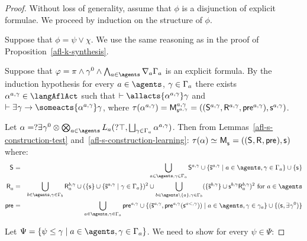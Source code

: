 \begin{proof}
    Without loss of generality, assume that $\phi$ is a disjunction of explicit formulae.
    We proceed by induction on the structure of $\phi$.

    Suppose that $\phi = \psi \lor \chi$. We use the same reasoning as in the proof of Proposition~\ref{afl-k-synthesis}.

    Suppose that $\phi = \pi \land \gamma^0 \land \bigwedge_{\agentA \in \agents} \coversA \Gamma_\agentA$ is an explicit formula.
    By the induction hypothesis for every $\agentA \in \agents$, $\gamma \in \Gamma_a$ there exists $\alpha^{\agentA,\gamma} \in \langAflAct$ such that $\proves \allacts{\alpha^{\agentA,\gamma}} \gamma$ and $\proves \somerefs \gamma \implies \someacts{\alpha^{\agentA,\gamma}} \gamma$, where $\tau(\alpha^{\agentA,\gamma}) = \aPModel[\agentA,\gamma]{\aStateS[\agentA,\gamma]} = \aPModelTuple[\agentA,\gamma]{\aStateS[\agentA,\gamma]}$.

    Let $\alpha = \test{\somerefs \gamma^0} \compose \bigcompose_{\agentA \in \agents} \learns_\agentA (\test{\top}, \bigchoice_{\gamma \in \Gamma_\agentA} \alpha^{\agentA,\gamma})$.
    Then from Lemmas~\ref{afl-s-construction-test} and~\ref{afl-s-construction-learning}: $\tau(\alpha) \bisimilar \aPModel{\aStateS} = \aPModelTuple{\aStateS}$ where:
    \begin{eqnarray*}
        \aStates &=& \bigcup_{\agentA \in \agents, \gamma \in \Gamma_\agentA} \aStates[\agentA,\gamma] \cup \{\aPStateS[\agentA,\gamma] \mid \agentA \in \agents, \gamma \in \Gamma_\agentA\} \cup \{\aStateS\}\\
        \aAccessibility{\agentA} &=& \bigcup_{\agentB \in \agents, \gamma \in \Gamma_\agentB} \aAccessibility[\agentB,\gamma]{\agentA} \cup (\{\aStateS\} \cup \{\aPStateS[\agentA,\gamma] \mid \gamma \in \Gamma_\agentA\})^2 \cup \bigcup_{\agentB \in \agents \setminus \{\agentA\}, \gamma \in \Gamma_\agentB} (\{\aPStateS[\agentB,\gamma]\} \cup \aStateS[\agentB,\gamma] \aAccessibility[\agentB,\gamma]{\agentA})^2 \text{ for } \agentA \in \agents\\
        \aPrecondition &=& \bigcup_{\agentA \in \agents, \gamma \in \Gamma_\agentA} \aPrecondition[\agentA,\gamma] \cup \{(\aPStateS[\agentA,\gamma], \aPrecondition[\agentA,\gamma](\aStateS[\agentA<,\gamma])) \mid \agentA \in \agents, \gamma \in \gamma_\agentA\} \cup \{(\aStateS, \somerefs \gamma^0)\}
    \end{eqnarray*}

    Let $\Psi = \{\psi \leq \gamma \mid \agentA \in \agents, \gamma \in \Gamma_\agentA\}$. We need to show for every $\psi \in \Psi$:


\end{proof}
